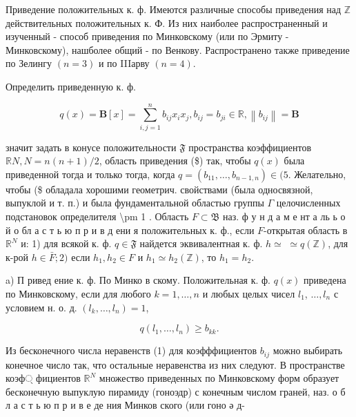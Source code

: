 \documentclass[10pt]{article}
\begin{document}
Приведение положительных к. ф. Имеются различные способы приведения над $\mathbb{Z}$ действительных положительных к. Ф. Из них наиболее распространенный и изученный - способ приведения по Минковскому (или по Эрмиту - Минковскому), нашболее общий - по Венкову. Распространено также приведение по Зелингу $(n=3)$ и по IIIарву $(n=4)$.



Определить приведенную к. ф.



\[

q(x)=\boldsymbol{B}[x]=\sum_{i, j=1}^{n} b_{i j} x_{i} x_{j}, b_{i j}=b_{j i} \in \mathbb{R},\left\|b_{i j}\right\|=\boldsymbol{B}

\]



значит задать в конусе положительности $\mathfrak{F}$ пространства коэффициентов $\mathbb{R} N, N=n(n+1) / 2$, область приведения (\$) так, чтобы $q(x)$ была приведенной тогда и только тогда, когда $q=\left(b_{11}, \ldots, b_{n-1, n}\right) \in(5$. Желательно, чтобы (\$ обладала хорошими геометрич. свойствами (была односвязной, выпуклой и т. п.) и была фундаментальной областью группы $\Gamma$ целочисленных подстановок определителя \textbackslash pm 1 . Область $F \subset \mathfrak{B}$ наз. ф у н д а м е нт а ль ь о й о бл а с т ь ю п р и в д ени я положительных к. ф., если $F$-открытая область в $\mathbb{R}^{N}$ и: 1) для всякой к. ф. $q \in \mathfrak{F}$ найдется эквивалентная к. ф. $h \simeq$ $\simeq q(\mathbb{Z})$, для к-рой $h \in \bar{F} ; 2)$ если $h_{1}, h_{2} \in F$ и $h_{1} \simeq h_{2}(\mathbb{Z})$, то $h_{1}=h_{2}$.



a) П ривед ение к. ф. По Минко в скому. Положительная к. ф. $q(x)$ приведена по Минковскому, если для любого $k=1, \ldots, n$ и любых целых чисел $l_{1}$, $\ldots, l_{n}$ с условием н. о. д. $\left(l_{k}, \ldots, l_{n}\right)=1$,



\[

q\left(l_{1}, \ldots, l_{n}\right) \geqslant b_{k k} .

\]



Из бесконечного числа неравенств (1) для коэфффициентов $b_{i j}$ можно выбирать конечное число так, что остальные неравенства из них следуют. В пространстве коэф্ фициентов $\mathbb{R}^{N}$ множество приведенных по Минковскому форм образует бесконечную выпуклую пирамиду (гоноэдр) с конечным числом граней, наз. о б л а с т ь ю п р и в е де ния Минков ского (или гоно ә д-
\end{document}
